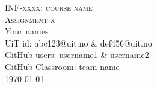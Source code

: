 \documentclass{article}
\def \courseCode {INF-xxxx}
\def \course {course name}
\def \thetitle {Assignment x}
\def \theauthor {Your names}
\begin{document}
	
	
\begin{center}
\textsc{\Large \courseCode: \course}\\[0,5cm]

\textsc{\Large \thetitle}\\[.75cm]

\Large{\theauthor} \\[0.25cm]

UiT id: abc123@uit.no \& def456@uit.no \\[0.25cm]
GitHub users: username1 \& username2 \\[0.25cm]
GitHub Classroom: team name \\[0.25cm]


{\large \today}

\end{center}	
	
\end{document}
